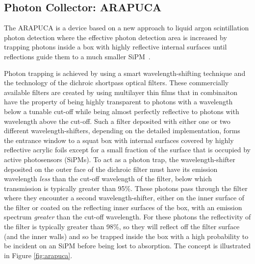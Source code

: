 

\subsection{Photon Collector: ARAPUCA}
\label{ssec:fdsp-pd-pc-arapuca}

The ARAPUCA is a device based on a new approach to liquid argon scintillation photon detection where the effective photon detection area is increased by trapping photons inside a box with highly reflective internal surfaces until reflections guide them to a much smaller SiPM~\cite{arapuca_jinst}. 

Photon trapping is achieved by using a smart wavelength-shifting technique and the technology of the dichroic shortpass optical filters. These commercially available filters are created by using multilayer thin films that in combinaiton have the property of being highly transparent to photons with a wavelength below a tunable cut-off while being almost perfectly reflective to photons with wavelength above the cut-off.  Such a filter deposited with either one or two different wavelength-shifters, depending on the detailed implementation,  forms the entrance window to a squat box with internal surfaces covered by highly reflective acrylic foils
except for a small fraction of the surface that is occupied by active photosensors (SiPMs).
To act as a photon trap, the wavelength-shifter deposited on the outer face of the dichroic filter must have its emission wavelength {\it less} than the cut-off wavelength of the filter, below which transmission is typically greater than 95\%. These photons pass through the filter where they encounter a second wavelength-shifter, either on the inner surface of the filter or coated on the reflecting inner surfaces of the box,
with an emission spectrum {\it greater} than the cut-off wavelength. For these photons the reflectivity of the filter is typically greater than 98\%, so they will reflect off the filter surface (and the inner walls) and so be trapped inside the box with a high probability to be incident on an SiPM before being lost to absorption. The concept is illustrated in Figure \ref{fig:arapuca}.

